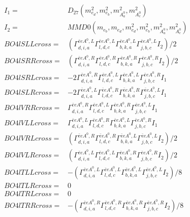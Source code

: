 \documentclass[A4,landscape]{article}
\begin{document}
\begin{align} 
I_1 = & D_{27}(m^2_{e_{{d}}}, m^2_{e_{{b}}}, m^2_{A^0_{{a}}}, m^2_{A^0_{{c}}}) \\ 
I_2 = & MMD0(m_{e_{{b}}}, m_{e_{{d}}}, m^2_{e_{{d}}}, m^2_{e_{{b}}}, m^2_{A^0_{{a}}}, m^2_{A^0_{{c}}}) \\ 
  BO4lSLLcross= & ( \Gamma^{\bar{e}e A^0 ,L}_{d, i, a} \Gamma^{\bar{e}e A^0 ,L}_{l, d, c} \Gamma^{\bar{e}e A^0 ,L}_{b, k, a} \Gamma^{\bar{e}e A^0 ,L}_{j, b, c} I_2)/2 \\ 
  BO4lSRRcross= & ( \Gamma^{\bar{e}e A^0 ,R}_{d, i, a} \Gamma^{\bar{e}e A^0 ,R}_{l, d, c} \Gamma^{\bar{e}e A^0 ,R}_{b, k, a} \Gamma^{\bar{e}e A^0 ,R}_{j, b, c} I_2)/2 \\ 
  BO4lSRLcross= & -2  \Gamma^{\bar{e}e A^0 ,R}_{d, i, a} \Gamma^{\bar{e}e A^0 ,L}_{l, d, c} \Gamma^{\bar{e}e A^0 ,L}_{b, k, a} \Gamma^{\bar{e}e A^0 ,R}_{j, b, c} I_1 \\ 
  BO4lSLRcross= & -2  \Gamma^{\bar{e}e A^0 ,L}_{d, i, a} \Gamma^{\bar{e}e A^0 ,R}_{l, d, c} \Gamma^{\bar{e}e A^0 ,R}_{b, k, a} \Gamma^{\bar{e}e A^0 ,L}_{j, b, c} I_1 \\ 
  BO4lVRRcross= &  \Gamma^{\bar{e}e A^0 ,R}_{d, i, a} \Gamma^{\bar{e}e A^0 ,L}_{l, d, c} \Gamma^{\bar{e}e A^0 ,R}_{b, k, a} \Gamma^{\bar{e}e A^0 ,L}_{j, b, c} I_1 \\ 
  BO4lVLLcross= &  \Gamma^{\bar{e}e A^0 ,L}_{d, i, a} \Gamma^{\bar{e}e A^0 ,R}_{l, d, c} \Gamma^{\bar{e}e A^0 ,L}_{b, k, a} \Gamma^{\bar{e}e A^0 ,R}_{j, b, c} I_1 \\ 
  BO4lVRLcross= & ( \Gamma^{\bar{e}e A^0 ,R}_{d, i, a} \Gamma^{\bar{e}e A^0 ,R}_{l, d, c} \Gamma^{\bar{e}e A^0 ,L}_{b, k, a} \Gamma^{\bar{e}e A^0 ,L}_{j, b, c} I_2)/2 \\ 
  BO4lVLRcross= & ( \Gamma^{\bar{e}e A^0 ,L}_{d, i, a} \Gamma^{\bar{e}e A^0 ,L}_{l, d, c} \Gamma^{\bar{e}e A^0 ,R}_{b, k, a} \Gamma^{\bar{e}e A^0 ,R}_{j, b, c} I_2)/2 \\ 
  BO4lTLLcross= & -( \Gamma^{\bar{e}e A^0 ,L}_{d, i, a} \Gamma^{\bar{e}e A^0 ,L}_{l, d, c} \Gamma^{\bar{e}e A^0 ,L}_{b, k, a} \Gamma^{\bar{e}e A^0 ,L}_{j, b, c} I_2)/8 \\ 
  BO4lTLRcross= & 0 \\ 
  BO4lTRLcross= & 0 \\ 
  BO4lTRRcross= & -( \Gamma^{\bar{e}e A^0 ,R}_{d, i, a} \Gamma^{\bar{e}e A^0 ,R}_{l, d, c} \Gamma^{\bar{e}e A^0 ,R}_{b, k, a} \Gamma^{\bar{e}e A^0 ,R}_{j, b, c} I_2)/8 \\ 
\end{align} 
\end{document}
